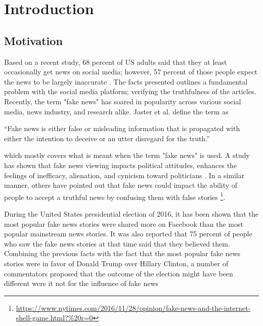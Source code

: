 \chapter{Introduction}\label{introduction}

\section{Motivation}\label{intro:motivation}

Based on a recent study, 68 percent of US adults said that they at least occasionally get news on social media; however, 57 percent of those people expect the news to be largely inaccurate \cite{matsa2018news}. The facts presented outlines a fundamental problem with the social media platform; verifying the truthfulness of the articles. Recently, the term "fake news" has soared in popularity across various social media, news industry, and research alike. Jaster et al. define the term as \cite{jasterfake}

\enquote{Fake news is either false or misleading information that is propagated with either the intention to deceive or an utter disregard for the truth.}

\noindent
which mostly covers what is meant when the term "fake news" is used. A study has shown that fake news viewing impacts political attitudes, enhances the feelings of inefficacy, alienation, and cynicism toward politicians \cite{balmas2014fake}. In a similar manner, others have pointed out that fake news could impact the ability of people to accept a truthful news by confusing them with false stories \footnote{\url{https://www.nytimes.com/2016/11/28/opinion/fake-news-and-the-internet-shell-game.html?\%20r=0}}.

During the United States presidential election of 2016, it has been shown that the most popular fake news stories were shared more on Facebook than the most popular mainstream news stories\cite{silverman2016analysis}. It was also reported that 75 percent of people who saw the fake news stories at that time said that they believed them\cite{silverman2016most}. Combining the previous facts with the fact that the most popular fake news stories were in favor of Donald Trump over Hillary Clinton\cite{silverman2016analysis}, a number of commentators proposed that the outcome of the election might have been different were it not for the influence of fake news \cite{parkinson2016click, read2016donald, dewey2016facebook}

